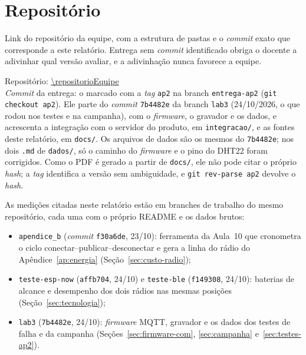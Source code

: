 \section{Repositório}
\label{sec:repositorio}

\begin{orientacao}
Link do repositório da equipe, com a estrutura de pastas e o
\emph{commit} exato que corresponde a este relatório. Entrega sem
\emph{commit} identificado obriga o docente a adivinhar qual versão
avaliar, e a adivinhação nunca favorece a equipe.
\end{orientacao}

\noindent Repositório: \url{\repositorioEquipe}\\
\emph{Commit} da entrega: o marcado com a \emph{tag} \texttt{ap2} na
branch \texttt{entrega-ap2} (\texttt{git checkout ap2}). Ele parte do
\emph{commit} \texttt{7b4482e} da branch \texttt{lab3} (24/10/2026, o
que rodou nos testes e na campanha), com o \emph{firmware}, o gravador e
os dados, e acrescenta a integração com o servidor do produto, em
\texttt{integracao/}, e as fontes deste relatório, em \texttt{docs/}.
Os arquivos de dados são os mesmos do \texttt{7b4482e}; nos dois
\texttt{.md} de \texttt{dados/}, só o caminho do \emph{firmware} e o
pino do DHT22 foram corrigidos. Como o PDF é gerado a partir de \texttt{docs/}, ele
não pode citar o próprio \emph{hash}; a \emph{tag} identifica a versão
sem ambiguidade, e \texttt{git rev-parse ap2} devolve o \emph{hash}.

\medskip
\noindent As medições citadas neste relatório estão em branches de
trabalho do mesmo repositório, cada uma com o próprio README e os dados
brutos:

\begin{itemize}
  \item \texttt{apendice\_b} (\emph{commit} \texttt{f30a6de}, 23/10):
    ferramenta da Aula~10 que cronometra o ciclo
    conectar--publicar--desconectar e gera a linha do rádio do
    Apêndice~\ref{ap:energia} (Seção~\ref{sec:custo-radio});
  \item \texttt{teste-esp-now} (\texttt{affb704}, 24/10) e
    \texttt{teste-ble} (\texttt{f149308}, 24/10): baterias de alcance e
    desempenho dos dois rádios nas mesmas posições
    (Seção~\ref{sec:tecnologia});
  \item \texttt{lab3} (\texttt{7b4482e}, 24/10): \emph{firmware} MQTT,
    gravador e os dados dos testes de falha e da campanha
    (Seções~\ref{sec:firmware-com}, \ref{sec:campanha}
    e~\ref{sec:testes-ap2}).
\end{itemize}

